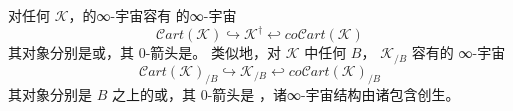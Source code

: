 \begin{proposition}\label{prop:cart-cocart-cosmoi}
对任何\trInfinityCosmos{} $\mathcal{K}$，\trIsofibration{}的∞-宇宙容有%
\trCosmologicalEmbedding{}的∞-宇宙
\[
\mathcal{C}\mathit{art}(\mathcal{K})\hookrightarrow\mathcal{K}^{\dagger}
\hookleftarrow\mathit{co}\mathcal{C}\mathit{art}(\mathcal{K})
\]
其对象分别是\trCartesianFibration{}或\trCocartesianFibration{}，其 0-箭头是\trCartesianFunctor。
类似地，对\trInfinityCosmos{} $\mathcal{K}$ 中任何\trInfinityCategory{} $B$，
\trSliceInfinityCosmos{} $\mathcal{K}_{/B}$ 容有\trCosmologicalEmbedding{}的
∞-宇宙
\[
\mathcal{C}\mathit{art}(\mathcal{K})_{/B}\hookrightarrow\mathcal{K}_{/B}
\hookleftarrow\mathit{co}\mathcal{C}\mathit{art}(\mathcal{K})_{/B}
\]
其对象分别是 $B$ 之上的\trCartesianFibration{}或\trCocartesianFibration{}，其 0-箭头是%
\trCartesianFunctor，诸∞-宇宙结构由诸包含创生。
\end{proposition}

